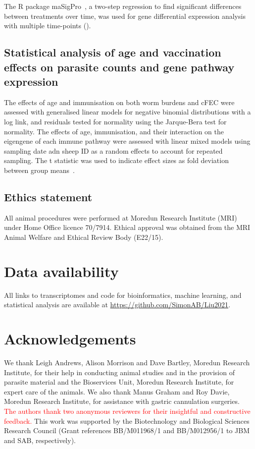 \documentclass[a4paper, hidelinks, 11pt]{article}
\begin{document}
The R package maSigPro~\supercite{Nueda2014}, a two-step regression to find
significant differences between treatments over time, was used for gene
differential expression analysis with multiple time-points ().

\subsection{Statistical analysis of age and vaccination effects on parasite counts and gene pathway expression}

The effects of age and immunisation on both worm burdens and cFEC were assessed
with generalised linear models for negative binomial distributions with a log
link, and residuals tested for normality using the Jarque-Bera test for
normality. The effects of age, immunisation, and their interaction on the
eigengene of each immune pathway were assessed with linear mixed models using
sampling date adn sheep ID as a random effects to account for repeated sampling.
The t statistic was used to indicate effect sizes as fold deviation between
group means~\supercite{Bates2015}.

\subsection{Ethics statement}

All animal procedures were performed at Moredun Research Institute (MRI) under
Home Office licence 70/7914. Ethical approval was obtained from the MRI Animal
Welfare and Ethical Review Body (E22/15).

\section{Data availability}

All links to transcriptomes and code for bioinformatics, machine learning, and
statistical analysis are available at \url{https://github.com/SimonAB/Liu2021}.

\section{Acknowledgements}

We thank Leigh Andrews, Alison Morrison and Dave Bartley, Moredun Research
Institute, for their help in conducting animal studies and in the provision of
parasite material and the Bioservices Unit, Moredun Research Institute, for
expert care of the animals. We also thank Manus Graham and Roy Davie, Moredun
Research Institute, for assistance with gastric cannulation surgeries.
\textcolor{red}{The authors thank two anonymous reviewers for their insightful
and constructive feedback.} This work was supported by the Biotechnology and
Biological Sciences Research Council (Grant references BB/M011968/1 and
BB/M012956/1 to JBM and SAB, respectively).
\end{document}
